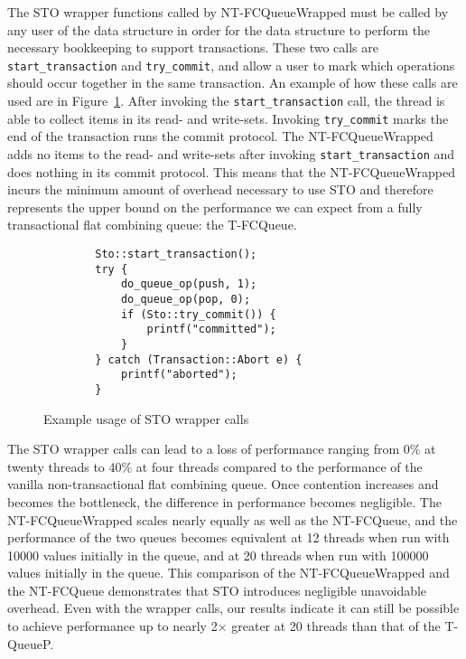 The STO wrapper functions called by NT-FCQueueWrapped must be called by any user of the data structure in order for the data structure to perform the necessary bookkeeping to support transactions.
These two calls are \texttt{start\_transaction} and \texttt{try\_commit}, and allow a user to mark which operations should occur together in the same transaction. An example of how these calls are used are in Figure~\ref{fig:wrappers}. After invoking the \texttt{start\_transaction} call, the thread is able to collect items in its read- and write-sets. Invoking \texttt{try\_commit} marks the end of the transaction runs the commit protocol. The NT-FCQueueWrapped adds no items to the read- and write-sets after invoking \texttt{start\_transaction} and does nothing in its commit protocol. This means that the NT-FCQueueWrapped incurs the minimum amount of overhead necessary to use STO and therefore represents the upper bound on the performance we can expect from a fully transactional flat combining queue: the T-FCQueue. 

\begin{figure}[t]
\centering
\singlespace
{}
	\begin{lstlisting}
		Sto::start_transaction();
		try {
			do_queue_op(push, 1);
			do_queue_op(pop, 0);
			if (Sto::try_commit()) {
				printf("committed");
			}
		} catch (Transaction::Abort e) {
			printf("aborted");
		}
	\end{lstlisting}
\caption{Example usage of STO wrapper calls}
\label{fig:wrappers}
\end{figure}

The STO wrapper calls can lead to a loss of performance ranging from 0\% at twenty threads to 40\% at four threads compared to the performance of the vanilla non-transactional flat combining queue. Once contention increases and becomes the bottleneck, the difference in performance becomes negligible. The NT-FCQueueWrapped scales nearly equally as well as the NT-FCQueue, and the performance of the two queues becomes equivalent at 12 threads when run with 10000 values initially in the queue, and at 20 threads when run with 100000 values initially in the queue. This comparison of the NT-FCQueueWrapped and the NT-FCQueue demonstrates that STO introduces negligible unavoidable overhead. Even with the wrapper calls, our results indicate it can still be possible to achieve performance up to nearly 2$\times$ greater at 20 threads than that of the T-QueueP.


